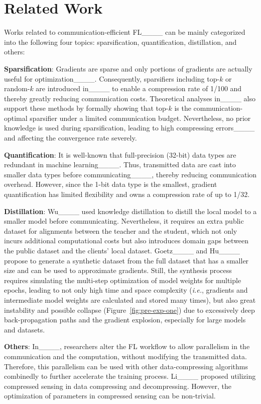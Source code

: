 \section{Related Work}
\label{sec:related-work}
Works related to communication-efficient FL____ can be mainly categorized into the following four topics: sparsification, quantification, distillation, and others:

\noindent\textbf{Sparsification}: 
Gradients are sparse and only portions of gradients are actually useful for optimization____.
Consequently, sparsifiers including top-$k$ or random-$k$ are introduced in____ to enable a compression rate of 1/100 and thereby greatly reducing communication costs.
Theoretical analyses in____ also support these methods by formally showing that top-$k$ is the communication-optimal sparsifier under a limited communication budget. 
Nevertheless, no prior knowledge is used during sparsification, leading to high compressing errors____ and affecting the convergence rate severely.

\noindent\textbf{Quantification}: 
It is well-known that full-precision (32-bit) data types are redundant in machine learning____.
Thus, transmitted data are cast into smaller data types before communicating____, thereby reducing communication overhead.
However, since the 1-bit data type is the smallest, gradient quantification has limited flexibility and owns a compression rate of up to 1/32.

\noindent\textbf{Distillation}:
Wu____ used knowledge distillation to distill the local model to a smaller model before communicating. 
Nevertheless, it requires an extra public dataset for alignments between the teacher and the student, which not only incurs additional computational costs but also introduces domain gaps between the public dataset and the clients' local dataset.
Goetz____ and Hu____ propose to generate a synthetic dataset from the full dataset that has a smaller size and can be used to approximate gradients.
Still, the synthesis process requires simulating the multi-step optimization of model weights for multiple epochs, leading to not only high time and space complexity (\textit{i.e.}, gradients and intermediate model weights are calculated and stored many times), but also great instability and possible collapse (Figure~\ref{fig:pre-exp-one}) due to excessively deep back-propagation paths and the gradient explosion, especially for large models and datasets.

\noindent\textbf{Others}:
In____, researchers alter the FL workflow to allow parallelism in the communication and the computation, without modifying the transmitted data.
Therefore, this parallelism can be used with other data-compressing algorithms combinedly to further accelerate the training process. Li____ proposed utilizing compressed sensing in data compressing and decompressing.
However, the optimization of parameters in compressed sensing can be non-trivial. 

